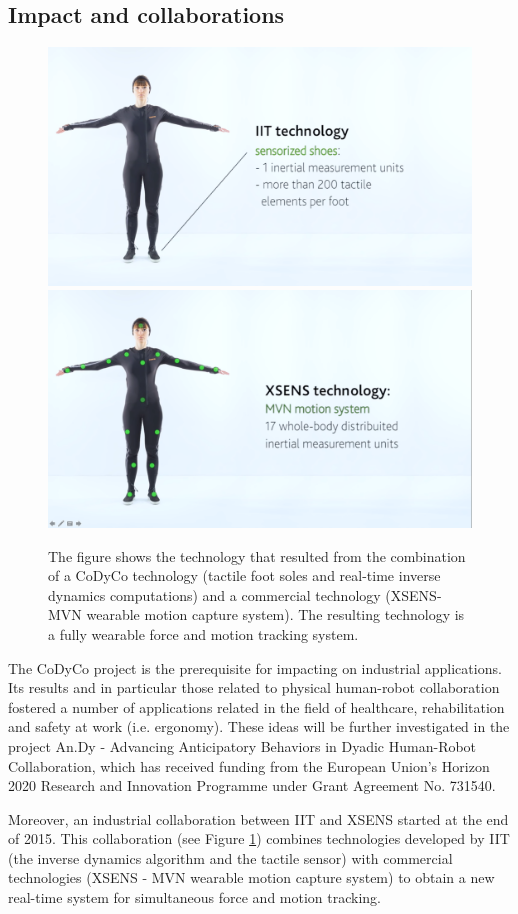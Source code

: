 \documentclass[12pt,a4paper,twoside]{article}
\begin{document}
\subsection{Impact and collaborations}

\begin{figure}
  \centering
    \includegraphics[width=.45\columnwidth]{images/AnDy-IIT}
    \hspace{1cm}
    \includegraphics[width=.45\columnwidth]{images/AnDy-XSENS}
  \caption{The figure shows the technology that resulted from the
  combination of a CoDyCo technology (tactile foot soles and real-time
  inverse dynamics computations) and a commercial technology
  (XSENS-MVN wearable motion capture system). The resulting technology
  is a fully wearable force and motion tracking system.}
 \label{fig:XSENS_IIT}
\end{figure}


The CoDyCo project is the prerequisite for impacting on industrial applications.
Its results and in particular those related to physical human-robot collaboration
fostered a number of applications related in the field of healthcare, rehabilitation
and safety at work (i.e. ergonomy). These ideas will be further investigated in 
the project An.Dy - Advancing Anticipatory Behaviors in Dyadic Human-Robot Collaboration,
which has received funding from the European Union's Horizon 2020 Research and Innovation Programme under Grant Agreement No. 731540.

Moreover, an industrial collaboration between IIT and XSENS started at the end of 
2015. This collaboration (see Figure \ref{fig:XSENS_IIT}) combines technologies
developed by IIT (the inverse dynamics algorithm and the tactile sensor) 
with commercial technologies (XSENS - MVN wearable motion capture system)
to obtain a new real-time system for simultaneous force and motion tracking.
\end{document}
